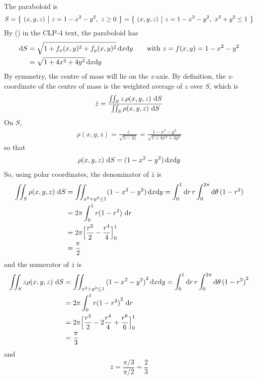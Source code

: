 \begin{solution}
The paraboloid is
\begin{equation*}
S = \big\{ \ (x,y,z)\ \big|\ z=1-x^2-y^2,\ z\ge 0\ \big\}
  = \big\{ \ (x,y,z)\ \big|\ z=1-x^2-y^2,\ x^2+y^2\le 1\ \big\}
\end{equation*}
By () in the CLP-4 text, the paraboloid has
\begin{align*}
\mathrm{d}S & = \sqrt{1+f_x(x,y)^2 + f_y(x,y)^2}\,\mathrm{d}x\mathrm{d}y
\qquad\text{with } z = f(x,y) = 1-x^2-y^2 \\
        & = \sqrt{1+4x^2 +4y^2}\,\mathrm{d}x\mathrm{d}y
\end{align*}
By symmetry, the centre of mass will lie on the $z$-axis.
By definition, the $z$-coordinate of the centre of mass is the weighted
average of $z$ over $S$, which is
\begin{equation*}
\bar z = \frac{\iint_S z\,\rho(x,y,z)\ \mathrm{d}S}
              {\iint_S \rho(x,y,z)\ \mathrm{d}S}
\end{equation*}
On $S$,
\begin{align*}
\rho(x,y,z) = \frac{z}{\sqrt{5-4z}}
            = \frac{1-x^2-y^2}{\sqrt{1+4x^2+4y^2}}
\end{align*}
so that
\begin{align*}
\rho(x,y,z)\ \mathrm{d}S
= (1-x^2-y^2)\,\mathrm{d}x\mathrm{d}y
\end{align*}
So, using polar coordinates, the denominator of $\bar z$ is
\begin{align*}
\iint_S \rho(x,y,z)\ \mathrm{d}S
     &= \iint_{x^2+y^2\le 1} (1-x^2-y^2)\,\mathrm{d}x\mathrm{d}y
     =\int_0^1\mathrm{d}r\, r\int_0^{2\pi}\mathrm{d}\theta\,  (1-r^2) \\
    &= 2\pi\int_0^1 r(1-r^2)\ \mathrm{d}r \\
    & = 2\pi \Big[\frac{r^2}{2}-\frac{r^4}{4}\Big]_0^1 \\
    &=\frac{\pi}{2}
\end{align*}
and the numerator of $\bar z$ is
\begin{align*}
\iint_S z \rho(x,y,z)\ \mathrm{d}S
     &= \iint_{x^2+y^2\le 1} {(1-x^2-y^2)}^2\,\mathrm{d}x\mathrm{d}y
     =\int_0^1\mathrm{d}r\, r\int_0^{2\pi}\mathrm{d}\theta\,  {(1-r^2)}^2 \\
    &= 2\pi\int_0^1 r{(1-r^2)}^2\ \mathrm{d}r \\
    & = 2\pi \Big[\frac{r^2}{2}-2\frac{r^4}{4}+\frac{r^6}{6}\Big]_0^1 \\
    &=\frac{\pi}{3}
\end{align*}
and
\begin{equation*}
\bar z = \frac{\pi/3}{\pi/2}=\frac{2}{3}
\end{equation*}
\end{solution}

